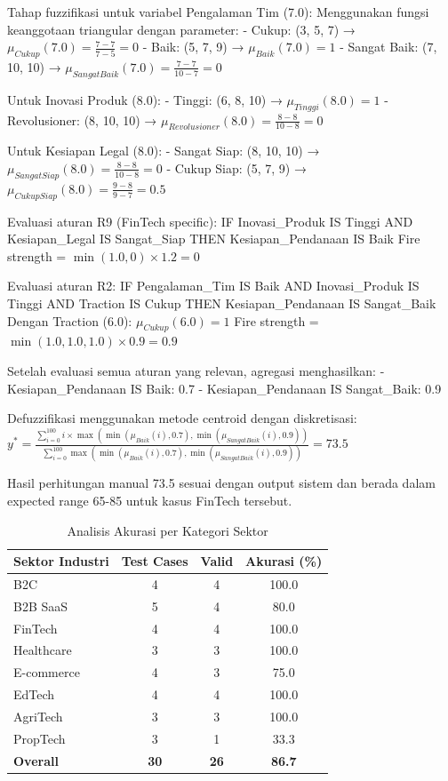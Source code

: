 \documentclass[12pt,a4paper]{article}
\begin{document}
Tahap fuzzifikasi untuk variabel Pengalaman Tim (7.0):
Menggunakan fungsi keanggotaan triangular dengan parameter:
- Cukup: (3, 5, 7) → $\mu_{Cukup}(7.0) = \frac{7-7}{7-5} = 0$
- Baik: (5, 7, 9) → $\mu_{Baik}(7.0) = 1$
- Sangat Baik: (7, 10, 10) → $\mu_{SangatBaik}(7.0) = \frac{7-7}{10-7} = 0$

Untuk Inovasi Produk (8.0):
- Tinggi: (6, 8, 10) → $\mu_{Tinggi}(8.0) = 1$
- Revolusioner: (8, 10, 10) → $\mu_{Revolusioner}(8.0) = \frac{8-8}{10-8} = 0$

Untuk Kesiapan Legal (8.0):
- Sangat Siap: (8, 10, 10) → $\mu_{SangatSiap}(8.0) = \frac{8-8}{10-8} = 0$
- Cukup Siap: (5, 7, 9) → $\mu_{CukupSiap}(8.0) = \frac{9-8}{9-7} = 0.5$

Evaluasi aturan R9 (FinTech specific): IF Inovasi\_Produk IS Tinggi AND Kesiapan\_Legal IS Sangat\_Siap THEN Kesiapan\_Pendanaan IS Baik
Fire strength = $\min(1.0, 0) \times 1.2 = 0$

Evaluasi aturan R2: IF Pengalaman\_Tim IS Baik AND Inovasi\_Produk IS Tinggi AND Traction IS Cukup THEN Kesiapan\_Pendanaan IS Sangat\_Baik
Dengan Traction (6.0): $\mu_{Cukup}(6.0) = 1$
Fire strength = $\min(1.0, 1.0, 1.0) \times 0.9 = 0.9$

Setelah evaluasi semua aturan yang relevan, agregasi menghasilkan:
- Kesiapan\_Pendanaan IS Baik: 0.7
- Kesiapan\_Pendanaan IS Sangat\_Baik: 0.9

Defuzzifikasi menggunakan metode centroid dengan diskretisasi:
$y^* = \frac{\sum_{i=0}^{100} i \times \max(\min(\mu_{Baik}(i), 0.7), \min(\mu_{SangatBaik}(i), 0.9))}{\sum_{i=0}^{100} \max(\min(\mu_{Baik}(i), 0.7), \min(\mu_{SangatBaik}(i), 0.9))} = 73.5$

Hasil perhitungan manual 73.5 sesuai dengan output sistem dan berada dalam expected range 65-85 untuk kasus FinTech tersebut.

\begin{table}[H]
\centering
\caption{Analisis Akurasi per Kategori Sektor}
\label{tab:sector-accuracy}
\begin{tabular}{@{}lccc@{}}
\toprule
\textbf{Sektor Industri} & \textbf{Test Cases} & \textbf{Valid} & \textbf{Akurasi (\%)} \\
\midrule
B2C & 4 & 4 & 100.0 \\
B2B SaaS & 5 & 4 & 80.0 \\
FinTech & 4 & 4 & 100.0 \\
Healthcare & 3 & 3 & 100.0 \\
E-commerce & 4 & 3 & 75.0 \\
EdTech & 4 & 4 & 100.0 \\
AgriTech & 3 & 3 & 100.0 \\
PropTech & 3 & 1 & 33.3 \\
\midrule
\textbf{Overall} & \textbf{30} & \textbf{26} & \textbf{86.7} \\
\bottomrule
\end{tabular}
\end{table}
\end{document}

